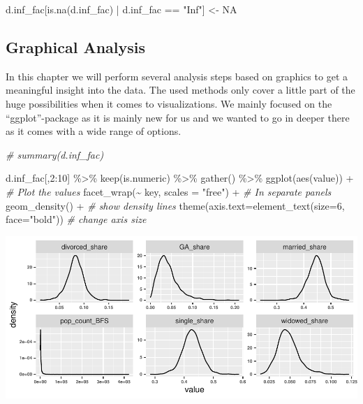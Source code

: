 \documentclass[
]{article}
\newenvironment{Shaded}{\begin{snugshade}}{\end{snugshade}}
\newcommand{\AttributeTok}[1]{\textcolor[rgb]{0.77,0.63,0.00}{#1}}
\newcommand{\CommentTok}[1]{\textcolor[rgb]{0.56,0.35,0.01}{\textit{#1}}}
\newcommand{\ConstantTok}[1]{\textcolor[rgb]{0.00,0.00,0.00}{#1}}
\newcommand{\DecValTok}[1]{\textcolor[rgb]{0.00,0.00,0.81}{#1}}
\newcommand{\FunctionTok}[1]{\textcolor[rgb]{0.00,0.00,0.00}{#1}}
\newcommand{\NormalTok}[1]{#1}
\newcommand{\OtherTok}[1]{\textcolor[rgb]{0.56,0.35,0.01}{#1}}
\newcommand{\SpecialCharTok}[1]{\textcolor[rgb]{0.00,0.00,0.00}{#1}}
\newcommand{\StringTok}[1]{\textcolor[rgb]{0.31,0.60,0.02}{#1}}
\begin{document}
\begin{Shaded}
\begin{Highlighting}[]
\NormalTok{d.inf\_fac[}\FunctionTok{is.na}\NormalTok{(d.inf\_fac) }\SpecialCharTok{|}\NormalTok{ d.inf\_fac }\SpecialCharTok{==} \StringTok{"Inf"}\NormalTok{] }\OtherTok{\textless{}{-}} \ConstantTok{NA}
\end{Highlighting}
\end{Shaded}

\hypertarget{graphical-analysis}{%
\subsection{Graphical Analysis}\label{graphical-analysis}}

In this chapter we will perform several analysis steps based on graphics
to get a meaningful insight into the data. The used methods only cover a
little part of the huge possibilities when it comes to visualizations.
We mainly focused on the ``ggplot''-package as it is mainly new for us
and we wanted to go in deeper there as it comes with a wide range of
options.

\begin{Shaded}
\begin{Highlighting}[]
\CommentTok{\# summary(d.inf\_fac)}

\NormalTok{d.inf\_fac[,}\DecValTok{2}\SpecialCharTok{:}\DecValTok{10}\NormalTok{] }\SpecialCharTok{\%\textgreater{}\%}
  \FunctionTok{keep}\NormalTok{(is.numeric) }\SpecialCharTok{\%\textgreater{}\%}
  \FunctionTok{gather}\NormalTok{() }\SpecialCharTok{\%\textgreater{}\%}
  \FunctionTok{ggplot}\NormalTok{(}\FunctionTok{aes}\NormalTok{(value))  }\SpecialCharTok{+}                   \CommentTok{\# Plot the values}
    \FunctionTok{facet\_wrap}\NormalTok{(}\SpecialCharTok{\textasciitilde{}}\NormalTok{ key, }\AttributeTok{scales =} \StringTok{"free"}\NormalTok{) }\SpecialCharTok{+}  \CommentTok{\# In separate panels}
    \FunctionTok{geom\_density}\NormalTok{() }\SpecialCharTok{+}                      \CommentTok{\# show density lines}
    \FunctionTok{theme}\NormalTok{(}\AttributeTok{axis.text=}\FunctionTok{element\_text}\NormalTok{(}\AttributeTok{size=}\DecValTok{6}\NormalTok{, }\AttributeTok{face=}\StringTok{"bold"}\NormalTok{)) }\CommentTok{\# change axis size}
\end{Highlighting}
\end{Shaded}

\includegraphics{Lin_Mod_Clus_Anal_files/figure-latex/unnamed-chunk-4-1.pdf}
\end{document}
